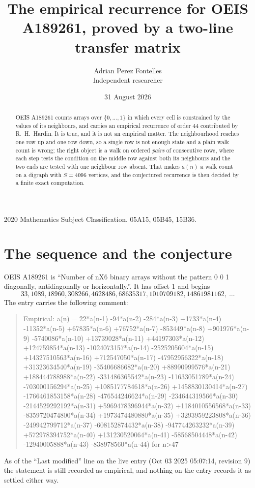 \documentclass[11pt,a4paper]{article}
\title{The empirical recurrence for OEIS A189261, proved by a two-line transfer matrix}
\author{Adrian Perez Fontelles\\ \small Independent researcher}
\date{31 August 2026}
\theoremstyle{plain}
\theoremstyle{definition}
\begin{document}
\maketitle

\begin{abstract}
OEIS A189261 counts arrays over $\{0,\dots,1\}$ in which every cell is constrained by the
values of its neighbours, and carries an empirical recurrence of order $44$ contributed
by R.~H.~Hardin. It is true, and it is not an empirical matter. The neighbourhood reaches one
row up and one row down, so a single row is not enough state and a plain walk count
is wrong; the right object is a walk on ordered \emph{pairs} of consecutive rows, where
each step tests the condition on the middle row against both its neighbours and the two
ends are tested with one neighbour row absent. That makes $a(n)$ a walk count on a digraph
with $S=4096$ vertices, and the conjectured recurrence is then decided by a finite exact
computation.
\end{abstract}

\noindent\small 2020 Mathematics Subject Classification. 05A15, 05B45, 15B36.\normalsize

\section{The sequence and the conjecture}

OEIS A189261 is ``Number of nX6 binary arrays without the pattern 0 0 1 diagonally, antidiagonally or horizontally.''. It has offset $1$ and begins
\[
33, 1089, 18960, 308266, 4628486, 68635317, 1010709182, 14861981162,\ \dots
\]
The entry carries the following comment:
\begin{quote}\small
Empirical: a(n) = 22*a(n-1) -94*a(n-2) -284*a(n-3) +1733*a(n-4) -11352*a(n-5) +67835*a(n-6) +76752*a(n-7) -853449*a(n-8) +901976*a(n-9) -5740086*a(n-10) +13739028*a(n-11) +44197303*a(n-12) +124759854*a(n-13) -1024073157*a(n-14) -2525205604*a(n-15) +14327510563*a(n-16) +712547050*a(n-17) -47952956322*a(n-18) +31323634540*a(n-19) -35406686682*a(n-20) +88990999576*a(n-21) +188444788988*a(n-22) -331486365542*a(n-23) -11633051789*a(n-24) -703000156294*a(n-25) +1085177784618*a(n-26) +1458830130414*a(n-27) -1766461853158*a(n-28) -476544246624*a(n-29) -234644319566*a(n-30) -2144529292192*a(n-31) +5969478396944*a(n-32) +1184010556568*a(n-33) -8359720474800*a(n-34) +1973474480880*a(n-35) +3293959223808*a(n-36) -249942799712*a(n-37) -608152874432*a(n-38) -947744263232*a(n-39) +572978394752*a(n-40) +131230520064*a(n-41) -58568504448*a(n-42) -12940005888*a(n-43) -838978560*a(n-44) for n>47
\end{quote}
As of the ``Last modified'' line on the live entry (Oct 03 2025 05:07:14, revision 9) the statement is
still recorded as empirical, and nothing on the entry records it as settled either way.
\end{document}
